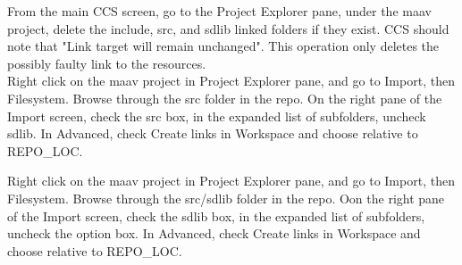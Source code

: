 \documentclass[]{article}
\begin{document}
From the main CCS screen, go to the Project Explorer pane, under the maav project, delete the include, src, and sdlib linked folders if they exist. CCS should note that "Link target will remain unchanged". This operation only deletes the possibly faulty link to the resources. \\

Right click on the maav project in Project Explorer pane, and go to Import, then Filesystem. Browse through the src folder in the repo. On the right pane of the Import screen, check the src box, in the expanded list of subfolders, uncheck sdlib. In Advanced, check Create links in Workspace and choose relative to REPO\_LOC.

Right click on the maav project in Project Explorer pane, and go to Import, then Filesystem. Browse through the src/sdlib folder in the repo. Oon the right pane of the Import screen, check the sdlib box, in the expanded list of subfolders, uncheck the option box. In Advanced, check Create links in Workspace and choose relative to REPO\_LOC.
\end{document}
